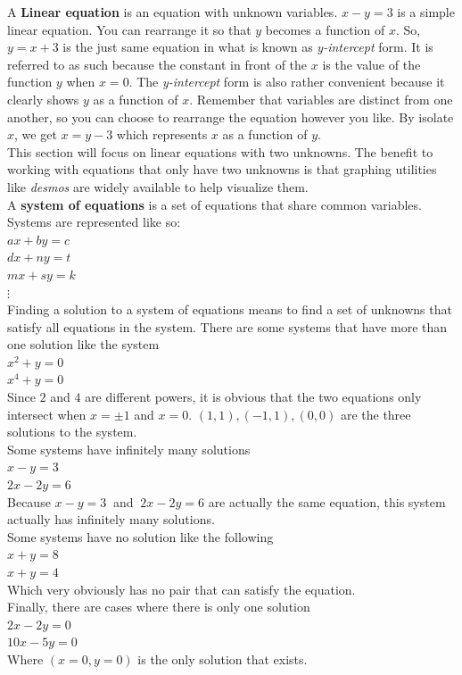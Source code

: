 \documentclass[12pt]{report}
\begin{document}
\hspace{\parindent}A \textbf{Linear equation} is an equation with unknown variables.
$x - y = 3$ is a simple linear equation. You can rearrange it so that $y$ becomes a function of $x$. So, $y=x+3$ is the just same equation in what is known as \textit{y-intercept} form. It is referred to as such because the constant in front of the $x$ is the value of the function $y$ when $x=0$. The \textit{y-intercept} form is also rather convenient because it clearly shows $y$ as a function of $x$. Remember that variables are distinct from one another, so you can choose to rearrange the equation however you like. By isolate $x$, we get $x=y-3$ which represents $x$ as a function of $y$.\medskip\\
This section will focus on linear equations with two unknowns. The benefit to working with equations that only have two unknowns is that graphing utilities like \textit{desmos} are widely available to help visualize them.\medskip\\
A \textbf{system of equations} is a set of equations that share common variables. Systems are represented like so:\medskip\\
$ax + by = c$\smallskip\\
$dx + ny = t$\smallskip\\
$mx + sy = k$\smallskip\\
$\vdots$\medskip\\
Finding a solution to a system of equations means to find a set of unknowns that satisfy all equations in the system. There are some systems that have more than one solution like the system\\
$x^2 + y=0$\\
$x^4+y=0$\\
Since $2$ and $4$ are different powers, it is obvious that the two equations only intersect when $x=\pm 1$ and $x=0$.
$(1, 1),(-1,1),(0,0)$ are the three solutions to the system.\\
Some systems have infinitely many solutions\\
$x-y=3$\\
$2x-2y=6$\\
Because $x-y=3~$ and $~2x-2y=6$ are actually the same equation, this system actually has infinitely many solutions.\\
Some systems have no solution like the following\\
$x+y=8$\\
$x+y=4$\\
Which very obviously has no pair that can satisfy the equation.\\
Finally, there are cases where there is only one solution\\
$2x - 2y = 0$\\
$10x - 5y = 0$\\
Where $(x=0, y=0)$ is the only solution that exists.
\end{document}
